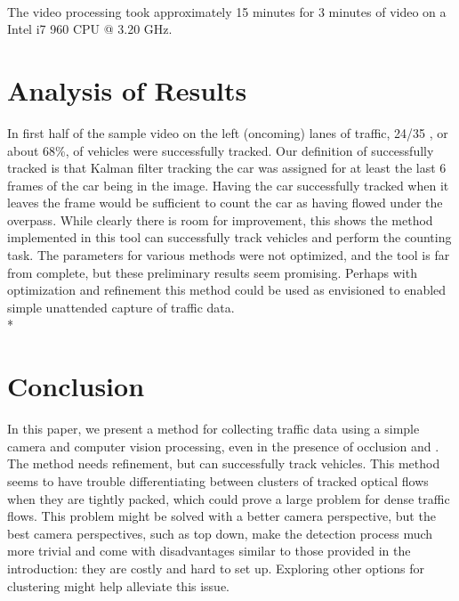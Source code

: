 \documentclass[draft]{article} %
\begin{document}
\paragraph{}The video processing took approximately 15 minutes for 3 minutes of video on a Intel i7 960 CPU @ 3.20 GHz.



\section{Analysis of Results}
In first half of the sample video on the left (oncoming) lanes of traffic, 24/35 , or about 68\%, of vehicles were successfully tracked. Our definition of successfully tracked is that Kalman filter tracking the car was assigned for at least the last 6 frames of the car being in the image. Having the car successfully tracked when it leaves the frame would be sufficient to count the car as having flowed under the overpass.  While clearly there is room for improvement, this shows the method implemented in this tool can successfully track vehicles and perform the counting task. The parameters for various methods were not optimized, and the tool is far from complete, but these preliminary results seem promising. Perhaps with optimization and refinement this method could be used as envisioned to enabled simple unattended capture of traffic data.\\*


\section{Conclusion}

In this paper, we present a method for collecting traffic data using a simple camera and computer vision processing, even in the presence of occlusion and . The method needs refinement, but can successfully track vehicles. This method seems to have trouble differentiating between clusters of tracked optical flows when they are tightly packed, which could prove a large problem for dense traffic flows. This problem might be solved with a better camera perspective, but the best camera perspectives, such as top down, make the detection process much more trivial and come with disadvantages similar to those provided in the introduction: they are costly and hard to set up. Exploring other options for clustering might help alleviate this issue.
\paragraph{}

\nocite{*}


\end{document}

